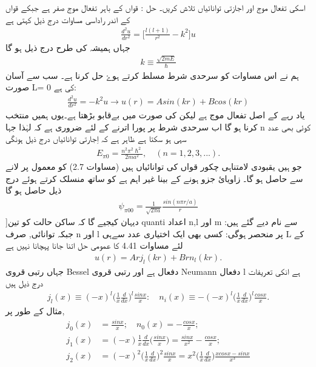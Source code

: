 اسکی تفعال موج اور اجازتی توانائیاں تلاش کریں۔
حل :
قواں کے باہر تفعال موج صفر ہے جبکے قواں کے اندر راداسی مساوات درج ذیل کہتی ہے
\begin{align}
\frac{d^{2}u}{dr^{2}}=\big[\frac{l(l+1)}{r^{2}}-k^{2}\big]u 
\end{align}
جہاں ہمیشہ کی طرح درج ذیل ہو گا 
\begin{align}
k\equiv\frac{\sqrt{2mE}}{\hslash} 
\end{align}
ہم نے اس مساوات کو سرحدی شرط
مسلط کرتے ہوۓ حل کرنا ہے۔ سب سے آسان صورت L= 0 کی ہے:
\begin{align}
\frac{d^{2}u}{dr^{2}}=-k^{2}u\to{u(r)=Asin(kr)+Bcos(kr)} 
\end{align}
یاد رہے کے اصل تفعال موج
ہے لیکن
کی صورت میں
بےقابو بڑھتا ہے۔یوں ہمیں
منتخب کرنا ہو گا اب سرحدی شرط پر پورا اترنے کے لئے ضروری ہے کہ
لہٰذا
جہا n کوئی بھی عدد سہی ہو سکتا ہے ظاہر ہے کہ اِجارتی توانائیاں درج ذیل ہونگی 
\begin{align}
E_{\pi0}=\frac{n^{2}\pi^{2}\hslash^{2}}{2ma^{2}},\quad(n=1,2,3,...). 
\end{align}
جو ہیں یقبودی لامتناہی چکور قواں کی توانائیاں ہیں (مساوات 2.7)
کو معمول پر لانے سے
حاصل ہو گا۔ زاویائ جزو
ہونے کے بینا غیر اہم ہے کو ساتھ منسلک کرتے ہوئے درج ذیل حاصل ہو گا
\begin{align}
\psi_{\pi00}=\frac{1}{\sqrt{2\pi{a}}}\frac{sin(n\pi{r/a})}{r} 
\end{align}
]دیہان کیجیے گا کہ ساکن حالت کو تین quanti اعداد n,l اور m سے نام دیے گئے ہیں:
جبکہ توانائی, صرف n اور l پر منحصر ہوگی:
\عددی{E{nl}.]}
کسی بھی ایک اختیاری عدد سےہی L کے لئے مساوات 4.41 کا عمومی حل اتنا جانا پہچانا نہیں ہے 
\begin{align}
u(r)=Arj_{l}(kr)+Brn_{l}(kr). 
\end{align}
جہاں
رتبی قروی Bessel دفعال ہے اور 
رتبی قروی Neumann دفعال l ہے انکی تعریفات درج ذیل ہیں 
\begin{align}
j_{l}(x)\equiv(-x)^{l}\big(\frac{1}{x}\frac{d}{dx}\big)^{l}\frac{sinx}{x}:\quad{n_{i}(x)\equiv-(-x)^{l}}\big(\frac{1}{x}\frac{d}{dx}\big)^{l}\frac{cosx}{x}. 
\end{align}
مثال کے طور پر,
\begin{align*}
j_{0}(x)&=\frac{sinx}{x};\quad{n_{0}(x)=-\frac{cosx}{x};}\\
j_1(x)&=(-x)\frac{1}{x}\frac{d}{dx}\big(\frac{sinx}{x}\big)=\frac{sinx}{x^{2}}-\frac{cosx}{x};\\
j_{2}(x)&=(-x)^{2}\big(\frac{1}{x}\frac{d}{dx}\big)^{2}\frac{sinx}{x}=x^{2}\big(\frac{1}{x}\frac{d}{dx}\big)\frac{xcosx-sinx}{x^{3}}\\
\end{align*}
